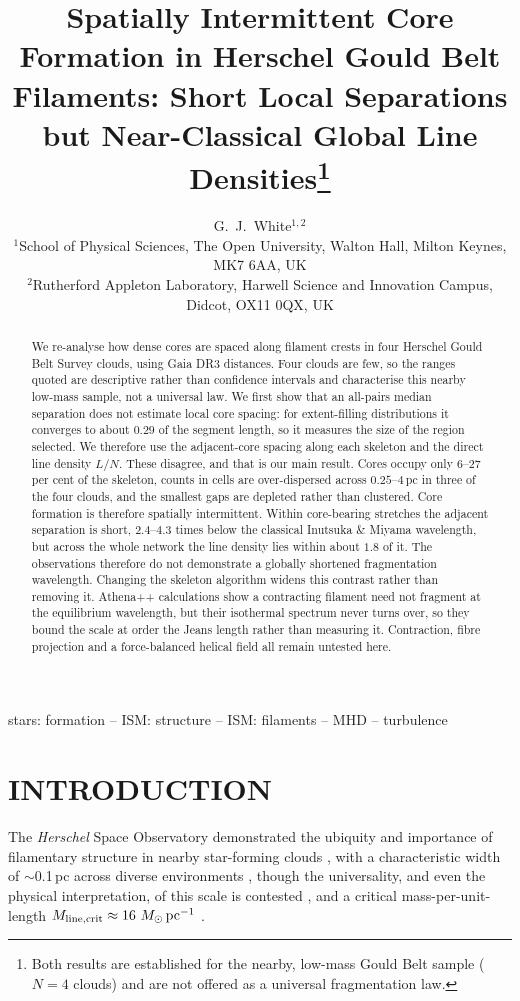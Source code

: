 \documentclass[usenatbib,twoside,twocolumn]{mnras}
\title[Intermittent core formation in HGBS filaments]{Spatially Intermittent Core Formation in Herschel Gould Belt Filaments: Short Local Separations but Near-Classical Global Line Densities\thanks{Both results are established for the nearby, low-mass Gould Belt sample ($N=4$ clouds) and are not offered as a universal fragmentation law.}}
\author[G.~J.~White]{G.~J.~White$^{1,2}$\\
$^{1}$School of Physical Sciences, The Open University, Walton Hall, Milton Keynes, MK7 6AA, UK\\
$^{2}$Rutherford Appleton Laboratory, Harwell Science and Innovation Campus, Didcot, OX11 0QX, UK}
\begin{document}
\maketitle

\begin{abstract}
We re-analyse how dense cores are spaced along filament crests in four Herschel Gould Belt Survey clouds, using Gaia DR3 distances. Four clouds are few, so the ranges quoted are descriptive rather than confidence intervals and characterise this nearby low-mass sample, not a universal law. We first show that an all-pairs median separation does not estimate local core spacing: for extent-filling distributions it converges to about $0.29$ of the segment length, so it measures the size of the region selected. We therefore use the adjacent-core spacing along each skeleton and the direct line density $L/N$. These disagree, and that is our main result. Cores occupy only $6$--$27$ per cent of the skeleton, counts in cells are over-dispersed across $0.25$--$4$\,pc in three of the four clouds, and the smallest gaps are depleted rather than clustered. Core formation is therefore spatially intermittent. Within core-bearing stretches the adjacent separation is short, $2.4$--$4.3$ times below the classical Inutsuka \& Miyama wavelength, but across the whole network the line density lies within about $1.8$ of it. The observations therefore do not demonstrate a globally shortened fragmentation wavelength. Changing the skeleton algorithm widens this contrast rather than removing it. Athena++ calculations show a contracting filament need not fragment at the equilibrium wavelength, but their isothermal spectrum never turns over, so they bound the scale at order the Jeans length rather than measuring it. Contraction, fibre projection and a force-balanced helical field all remain untested here.
\end{abstract}

\begin{keywords}
stars: formation -- ISM: structure -- ISM: filaments -- MHD -- turbulence
\end{keywords}

\section{INTRODUCTION}

The \textit{Herschel} Space Observatory demonstrated the ubiquity and importance of filamentary structure in nearby star-forming clouds \citep{Andre2010}, with a characteristic width of $\sim$0.1\,pc across diverse environments \citep{Arzoumanian2011}, though the universality, and even the physical interpretation, of this scale is contested \citep{Panopoulou2017,Panopoulou2022}, and a critical mass-per-unit-length $M_{\rm line,crit}\approx16~M_\odot\,{\rm pc^{-1}}$ \citep{Ostriker1964}.
\end{document}
